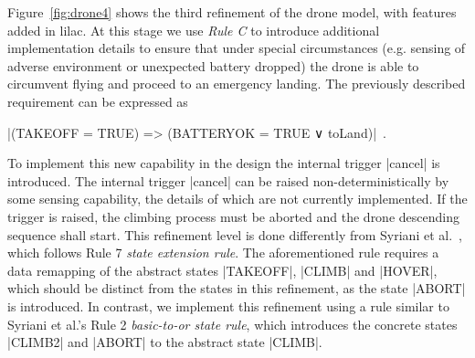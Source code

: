 Figure~\ref{fig:drone4} shows the third refinement of the drone model, with features added in lilac.
At this stage we use \emph{Rule C} to introduce additional implementation details to ensure that under special 
circumstances (e.g. sensing of adverse environment or unexpected battery dropped) the drone is able 
to circumvent flying and proceed to an emergency landing. The previously described requirement can be
expressed as
\begin{center}
  |(TAKEOFF = TRUE) => (BATTERYOK = TRUE ∨ toLand)|~.
\end{center}
To implement this new capability in the design the internal trigger |cancel| is introduced.
The internal trigger |cancel| can be raised non-deterministically by some sensing capability, 
the details of which are not currently implemented. If the trigger is raised, the climbing process 
must be aborted and the drone descending sequence shall start. This refinement level is done differently 
from Syriani et al.~\cite{Syriani_2019}, which follows Rule 7 \emph{state extension rule}. 
The aforementioned rule requires a data remapping of the abstract states |TAKEOFF|, |CLIMB| and |HOVER|,
which should be distinct from the states in this refinement, as the state |ABORT| is introduced.
In contrast, we implement this refinement using a rule similar to Syriani et al.'s 
Rule 2 \emph{basic-to-or state rule}, which introduces the concrete states |CLIMB2| and |ABORT| 
to the abstract state |CLIMB|.




